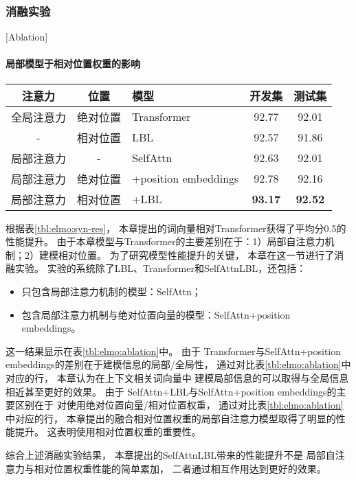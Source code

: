 \subsubsection{消融实验}[Ablation]
\paragraph{局部模型于相对位置权重的影响}
\begin{table}[t]
	\vspace{0.5em}\centering\wuhao
	\begin{tabular}{cclcc}
	\toprule[1.5pt]
	注意力 & 位置 & 模型 & 开发集 & 测试集 \\
	\midrule[1pt]
	全局注意力 & 绝对位置 & Transformer & 92.77 & 92.01 \\
	- & 相对位置 & LBL & 92.57 & 91.86 \\
	局部注意力& -& SelfAttn & 92.63 & 92.01 \\
	局部注意力& 绝对位置 & \quad +position embeddings & 92.78 & 92.16 \\
	局部注意力& 相对位置 & \quad +LBL & \textbf{93.17} & \textbf{92.52} \\
	\bottomrule[1.5pt]
\end{tabular}
\end{table}
根据表\ref{tbl:elmo:syn-res}，
本章提出的词向量相对Transformer获得了平均分0.5的性能提升。
由于本章模型与Transformer的主要差别在于：1）局部自注意力机制；2）建模相对位置。
为了研究模型性能提升的关键，
本章在这一节进行了消融实验。
实验的系统除了LBL、Transformer和SelfAttnLBL，还包括：
\begin{itemize}
	\item 只包含局部注意力机制的模型：SelfAttn；
	\item 包含局部注意力机制与绝对位置向量的模型：SelfAttn+position embeddings。
\end{itemize}
这一结果显示在表\ref{tbl:elmo:ablation}中。
由于
Transformer与SelfAttn+position embeddings的差别在于建模信息的局部/全局性，
通过对比表\ref{tbl:elmo:ablation}中对应的行，
本章认为在上下文相关词向量中
建模局部信息的可以取得与全局信息相近甚至更好的效果。
由于
SelfAttn+LBL与SelfAttn+position embeddings的主要区别在于
对使用绝对位置向量/相对位置权重，
通过对比表\ref{tbl:elmo:ablation}中对应的行，
本章提出的融合相对位置权重的局部自注意力模型取得了明显的性能提升。
这表明使用相对位置权重的重要性。

综合上述消融实验结果，
本章提出的SelfAttnLBL带来的性能提升不是
局部自注意力与相对位置权重性能的简单累加，
二者通过相互作用达到更好的效果。

